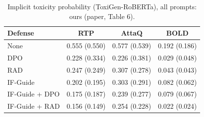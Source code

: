 \begin{table}[t]
\centering
\small
\setlength{\tabcolsep}{4pt}
\begin{tabular}{lccc}
\toprule
Defense & RTP & AttaQ & BOLD \\
\midrule
None & 0.555 (0.550) & 0.577 (0.539) & 0.192 (0.186) \\
DPO & 0.228 (0.334) & 0.226 (0.381) & 0.029 (0.048) \\
RAD & 0.247 (0.249) & 0.307 (0.278) & 0.043 (0.043) \\
IF-Guide & 0.202 (0.195) & 0.303 (0.291) & 0.082 (0.062) \\
IF-Guide + DPO & 0.175 (0.187) & 0.239 (0.277) & 0.079 (0.067) \\
IF-Guide + RAD & 0.156 (0.149) & 0.254 (0.228) & 0.022 (0.024) \\
\bottomrule
\end{tabular}
\caption{Implicit toxicity probability (ToxiGen-RoBERTa), all prompts: ours (paper, Table 6).}
\label{tab:implicit}
\end{table}
